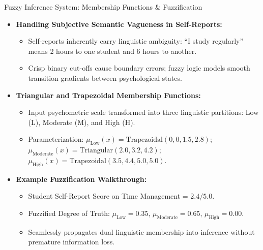 \documentclass{beamer}
\begin{document}
\begin{frame}[t]{Fuzzy Inference System: Membership Functions \& Fuzzification}
  \begin{itemize}\setlength{\itemsep}{6pt}\small
    \item \textbf{Handling Subjective Semantic Vagueness in Self-Reports:}
    \begin{itemize}\setlength{\itemsep}{2pt}\footnotesize
      \item Self-reports inherently carry linguistic ambiguity: ``I study regularly'' means 2 hours to one student and 6 hours to another.
      \item Crisp binary cut-offs cause boundary errors; fuzzy logic models smooth transition gradients between psychological states.
    \end{itemize}
    \item \textbf{Triangular and Trapezoidal Membership Functions:}
    \begin{itemize}\setlength{\itemsep}{2pt}\footnotesize
      \item Input psychometric scale transformed into three linguistic partitions: Low (L), Moderate (M), and High (H).
      \item Parameterization: $\mu_{\text{Low}}(x) = \text{Trapezoidal}(0, 0, 1.5, 2.8)$; $\mu_{\text{Moderate}}(x) = \text{Triangular}(2.0, 3.2, 4.2)$; $\mu_{\text{High}}(x) = \text{Trapezoidal}(3.5, 4.4, 5.0, 5.0)$.
    \end{itemize}
    \item \textbf{Example Fuzzification Walkthrough:}
    \begin{itemize}\setlength{\itemsep}{2pt}\footnotesize
      \item Student Self-Report Score on Time Management = $2.4 / 5.0$.
      \item Fuzzified Degree of Truth: $\mu_{\text{Low}} = 0.35$, $\mu_{\text{Moderate}} = 0.65$, $\mu_{\text{High}} = 0.00$.
      \item Seamlessly propagates dual linguistic membership into inference without premature information loss.
    \end{itemize}
  \end{itemize}
\end{frame}
\end{document}
